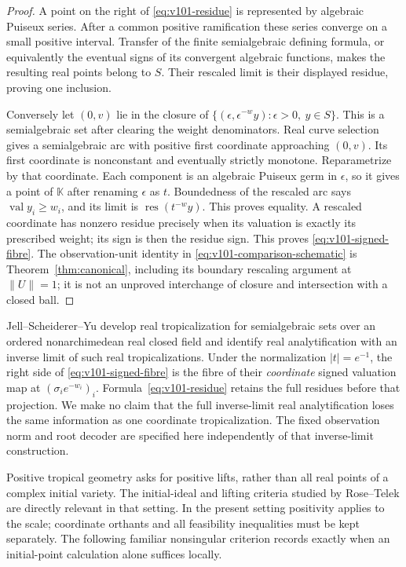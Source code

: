 \begin{proof}
A point on the right of \eqref{eq:v101-residue} is represented by
algebraic Puiseux series. After a common positive ramification these
series converge on a small positive interval. Transfer of the finite
semialgebraic defining formula, or equivalently the eventual signs of
its convergent algebraic functions, makes the resulting real points
belong to $S$. Their rescaled limit is their displayed residue, proving
one inclusion.

Conversely let $(0,v)$ lie in the closure of
$\{(\epsilon,\epsilon^{-w}y):\epsilon>0,\ y\in S\}$. This is a
semialgebraic set after clearing the weight denominators. Real curve
selection gives a semialgebraic arc with positive first coordinate
approaching $(0,v)$. Its first coordinate is nonconstant and eventually
strictly monotone. Reparametrize by that coordinate. Each component is
an algebraic Puiseux germ in $\epsilon$, so it gives a point of
$\mathbb K$ after renaming $\epsilon$ as $t$. Boundedness of the
rescaled arc says $\operatorname{val}y_i\ge w_i$, and its limit is
$\operatorname{res}(t^{-w}y)$. This proves equality.
A rescaled coordinate has nonzero residue precisely when its valuation
is exactly its prescribed weight; its sign is then the residue sign.
This proves \eqref{eq:v101-signed-fibre}. The observation-unit identity
in \eqref{eq:v101-comparison-schematic} is
Theorem~\ref{thm:canonical}, including its boundary rescaling argument
at $\|U\|=1$; it is not an unproved interchange of closure and
intersection with a closed ball.
\end{proof}

Jell--Scheiderer--Yu \cite{A2JSY22} develop real tropicalization for
semialgebraic sets over an ordered nonarchimedean real closed field and
identify real analytification with an inverse limit of such
real tropicalizations. Under the normalization $|t|=e^{-1}$, the
right side of \eqref{eq:v101-signed-fibre} is the fibre of their
\emph{coordinate} signed valuation map at
$(\sigma_i e^{-w_i})_i$. Formula~\eqref{eq:v101-residue} retains the
full residues before that projection. We make no claim that the full
inverse-limit real analytification loses the same information as one
coordinate tropicalization. The fixed observation norm and root decoder
are specified here independently of that inverse-limit construction.

Positive tropical geometry asks for positive lifts, rather than all real
points of a complex initial variety. The initial-ideal and lifting
criteria studied by Rose--Telek \cite{A2RT26} are directly relevant
in that setting. In the present setting positivity applies to the
scale; coordinate orthants and all feasibility inequalities must be
kept separately. The following familiar nonsingular criterion records
exactly when an initial-point calculation alone suffices locally.

